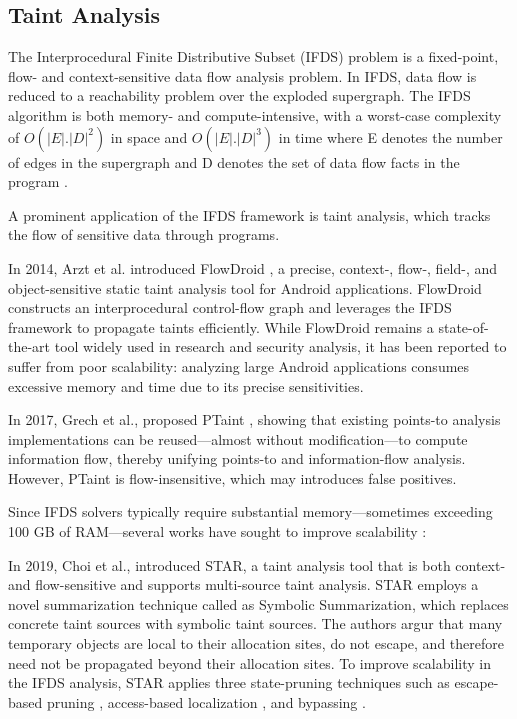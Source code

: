 \subsection{Taint Analysis}

The Interprocedural Finite Distributive Subset (IFDS) problem is a fixed-point, flow- and context-sensitive data flow analysis problem. 
In IFDS, data flow is reduced to a reachability problem over the exploded supergraph. The IFDS algorithm is both memory- and compute-intensive, with a worst-case complexity of
$O(|E| . |D|^2)$ in space and $O(|E| . |D|^3)$ in time where E denotes the number of edges in the supergraph and D denotes the set of data flow facts in the program \cite{reps1995precise}.

A prominent application of the IFDS framework is taint analysis, which tracks the flow of sensitive data through programs.

In 2014, Arzt et al. introduced FlowDroid \cite{arzt2014flowdroid}, a precise, context-, flow-, field-, and object-sensitive static taint analysis tool for Android applications. FlowDroid constructs an interprocedural control-flow graph and leverages the IFDS framework to propagate taints efficiently. 
While FlowDroid remains a state-of-the-art tool widely used in research and security analysis, it has been reported to suffer from poor scalability: 
analyzing large Android applications consumes excessive memory and time due to its precise sensitivities. \cite{li2021scaling}

In 2017, Grech et al., proposed PTaint \cite{grech2017p}, showing that existing points-to analysis implementations can be reused—almost without modification—to compute information flow, thereby unifying points-to and information-flow analysis. 
However, PTaint is flow-insensitive, which may introduces false positives.

Since IFDS solvers typically require substantial memory—sometimes exceeding 100 GB of RAM—several works have sought to improve scalability \cite{li2021scaling}:

In 2019, Choi et al., \cite{choi2019scalable} introduced STAR, a taint analysis tool that is both context- and flow-sensitive and supports multi-source taint analysis.
STAR employs a novel summarization technique called as Symbolic Summarization, which replaces concrete taint sources with symbolic taint sources.
The authors argur that many temporary objects are local to their allocation sites, do not escape, and therefore need not be propagated beyond their allocation sites.
To improve scalability in the IFDS analysis, STAR applies three state-pruning techniques such as escape-based pruning \cite{choi1999escape}, access-based localization \cite{oh2011access}, and bypassing \cite{oh2011access}.

